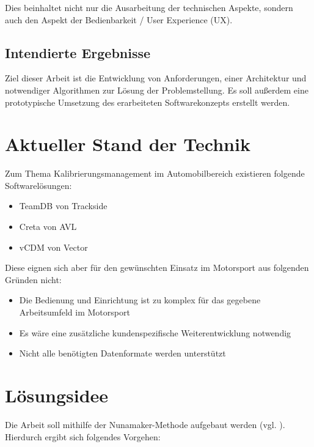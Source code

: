 \documentclass[12pt]{article} %
\begin{document}
Dies beinhaltet nicht nur die Ausarbeitung der technischen Aspekte, sondern auch den Aspekt der Bedienbarkeit / User Experience (UX).

\subsection{Intendierte Ergebnisse}
Ziel dieser Arbeit ist die Entwicklung von Anforderungen, einer Architektur und notwendiger Algorithmen zur Lösung der Problemstellung. Es soll außerdem eine prototypische Umsetzung des erarbeiteten Softwarekonzepts erstellt werden.


\section{Aktueller Stand der Technik}
Zum Thema Kalibrierungsmanagement im Automobilbereich existieren folgende Softwarelösungen:
\begin{itemize}
  \item TeamDB von Trackside \cite{TrackSide.TeamDB.2024}
  \item Creta von AVL \cite{AVL.CRETA.2024}
  \item vCDM von Vector \cite{Vector.vCDM.2024}
\end{itemize}

Diese eignen sich aber für den gewünschten Einsatz im Motorsport aus folgenden Gründen nicht:
\begin{itemize}
  \item Die Bedienung und Einrichtung ist zu komplex für das gegebene Arbeitsumfeld im Motorsport
  \item Es wäre eine zusätzliche kundenspezifische Weiterentwicklung notwendig
  \item Nicht alle benötigten Datenformate werden unterstützt
\end{itemize}

\section{Lösungsidee}
Die Arbeit soll mithilfe der Nunamaker-Methode aufgebaut werden (vgl. \cite{J.F.Nunamaker.1990}). Hierdurch ergibt sich folgendes Vorgehen:
\end{document}
